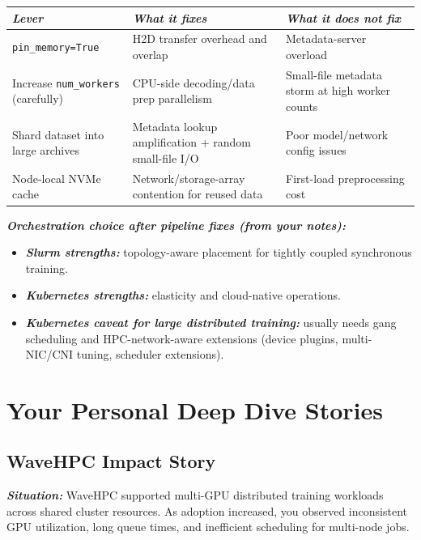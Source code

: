 \documentclass[12pt]{article}
\let\origtextbf\textbf
\renewcommand{\textbf}[1]{\origtextbf{\textit{#1}}}
\begin{document}
{\footnotesize
\begin{tabularx}{\textwidth}{|>{\raggedright\arraybackslash}p{3.1cm}|X|X|}
\hline
\textbf{Lever} & \textbf{What it fixes} & \textbf{What it does not fix} \\
\hline
\texttt{pin\_memory=True} & H2D transfer overhead and overlap & Metadata-server overload \\
\hline
Increase \texttt{num\_workers} (carefully) & CPU-side decoding/data prep parallelism & Small-file metadata storm at high worker counts \\
\hline
Shard dataset into large archives & Metadata lookup amplification + random small-file I/O & Poor model/network config issues \\
\hline
Node-local NVMe cache & Network/storage-array contention for reused data & First-load preprocessing cost \\
\hline
\end{tabularx}
}

\textbf{Orchestration choice after pipeline fixes (from your notes):}
\begin{itemize}
\item \textbf{Slurm strengths:} topology-aware placement for tightly coupled synchronous training.
\item \textbf{Kubernetes strengths:} elasticity and cloud-native operations.
\item \textbf{Kubernetes caveat for large distributed training:} usually needs gang scheduling and HPC-network-aware extensions (device plugins, multi-NIC/CNI tuning, scheduler extensions).
\end{itemize}






\vspace{2cm}

\section{Your Personal Deep Dive Stories}

\subsection{WaveHPC Impact Story}
\textbf{Situation:}
WaveHPC supported multi-GPU distributed training workloads across shared cluster resources. As adoption increased, you observed inconsistent GPU utilization, long queue times, and inefficient scheduling for multi-node jobs.
\end{document}
